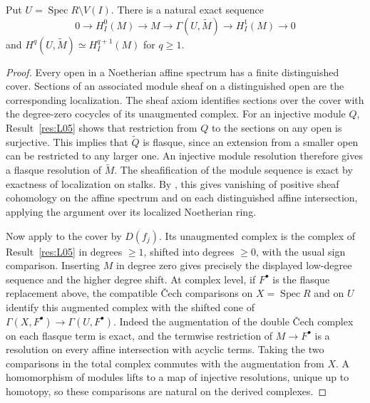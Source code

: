 \begin{proposition}\label{res:L10}
Put \(U=\operatorname{Spec} R\setminus V(I)\).
There is a natural exact sequence
\[
 0\to H_I^0(M)\to M\to\Gamma(U,\widetilde M)\to H_I^1(M)\to0
\]
and \(H^q(U,\widetilde M)\simeq H_I^{q+1}(M)\) for \(q\geq1\).
\end{proposition}
\begin{proof}
Every open in a Noetherian affine spectrum has a finite distinguished
cover. Sections of an associated module sheaf on a distinguished open
are the corresponding localization. The sheaf axiom identifies sections
over the cover with the degree-zero cocycles of its unaugmented complex.
For an injective module \(Q\), Result~\ref{res:L05} shows that restriction
from \(Q\) to the sections on any open is surjective. This implies
that \(\widetilde Q\) is flasque, since an extension from a smaller
open can be restricted to any larger one. An injective module
resolution therefore gives a flasque resolution of \(\widetilde M\).
The sheafification of the module sequence is exact by exactness of
localization on stalks. By \cite[H01]{homological}, this gives
vanishing of positive sheaf cohomology on the affine spectrum and
on each distinguished affine intersection, applying the argument
over its localized Noetherian ring.

Now apply \cite[H02--H04]{homological} to the cover by \(D(f_j)\).
Its unaugmented complex is the complex of Result~\ref{res:L05}
in degrees \(\geq1\), shifted into degrees \(\geq0\), with the
usual sign comparison. Inserting \(M\) in degree zero gives precisely
the displayed low-degree sequence and the higher degree shift.
At complex level, if \(F^\bullet\) is the flasque replacement above,
the compatible \v{C}ech comparisons on \(X=\operatorname{Spec}R\) and
on \(U\) identify this augmented complex with the shifted cone of
\(\Gamma(X,F^\bullet)\to\Gamma(U,F^\bullet)\).
Indeed the augmentation of the double \v{C}ech complex on each flasque
term is exact, and the termwise restriction of \(M\to F^\bullet\)
is a resolution on every affine intersection with acyclic terms.
Taking the two comparisons in the total complex commutes with
the augmentation from \(X\). A homomorphism of modules lifts to a
map of injective resolutions, unique up to homotopy, so these
comparisons are natural on the derived complexes.
\end{proof}

